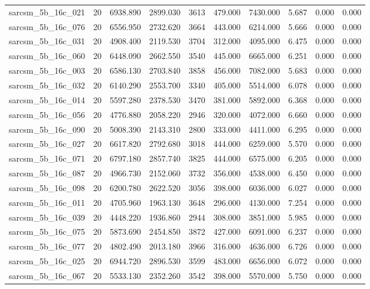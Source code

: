 \begin{tabular}{lrrrrrrrrr}
sarcsm\_5b\_16c\_021 & 20 & 6938.890 & 2899.030 & 3613 & 479.000 & 7430.000 & 5.687 & 0.000 & 0.000 \\
sarcsm\_5b\_16c\_076 & 20 & 6556.950 & 2732.620 & 3664 & 443.000 & 6214.000 & 5.666 & 0.000 & 0.000 \\
sarcsm\_5b\_16c\_031 & 20 & 4908.400 & 2119.530 & 3704 & 312.000 & 4095.000 & 6.475 & 0.000 & 0.000 \\
sarcsm\_5b\_16c\_060 & 20 & 6448.090 & 2662.550 & 3540 & 445.000 & 6665.000 & 6.251 & 0.000 & 0.000 \\
sarcsm\_5b\_16c\_003 & 20 & 6586.130 & 2703.840 & 3858 & 456.000 & 7082.000 & 5.683 & 0.000 & 0.000 \\
sarcsm\_5b\_16c\_032 & 20 & 6140.290 & 2553.700 & 3340 & 405.000 & 5514.000 & 6.078 & 0.000 & 0.000 \\
sarcsm\_5b\_16c\_014 & 20 & 5597.280 & 2378.530 & 3470 & 381.000 & 5892.000 & 6.368 & 0.000 & 0.000 \\
sarcsm\_5b\_16c\_056 & 20 & 4776.880 & 2058.220 & 2946 & 320.000 & 4072.000 & 6.660 & 0.000 & 0.000 \\
sarcsm\_5b\_16c\_090 & 20 & 5008.390 & 2143.310 & 2800 & 333.000 & 4411.000 & 6.295 & 0.000 & 0.000 \\
sarcsm\_5b\_16c\_027 & 20 & 6617.820 & 2792.680 & 3018 & 444.000 & 6259.000 & 5.570 & 0.000 & 0.000 \\
sarcsm\_5b\_16c\_071 & 20 & 6797.180 & 2857.740 & 3825 & 444.000 & 6575.000 & 6.205 & 0.000 & 0.000 \\
sarcsm\_5b\_16c\_087 & 20 & 4966.730 & 2152.060 & 3732 & 356.000 & 4538.000 & 6.450 & 0.000 & 0.000 \\
sarcsm\_5b\_16c\_098 & 20 & 6200.780 & 2622.520 & 3056 & 398.000 & 6036.000 & 6.027 & 0.000 & 0.000 \\
sarcsm\_5b\_16c\_011 & 20 & 4705.960 & 1963.130 & 3648 & 296.000 & 4130.000 & 7.254 & 0.000 & 0.000 \\
sarcsm\_5b\_16c\_039 & 20 & 4448.220 & 1936.860 & 2944 & 308.000 & 3851.000 & 5.985 & 0.000 & 0.000 \\
sarcsm\_5b\_16c\_075 & 20 & 5873.690 & 2454.850 & 3872 & 427.000 & 6091.000 & 6.237 & 0.000 & 0.000 \\
sarcsm\_5b\_16c\_077 & 20 & 4802.490 & 2013.180 & 3966 & 316.000 & 4636.000 & 6.726 & 0.000 & 0.000 \\
sarcsm\_5b\_16c\_025 & 20 & 6944.720 & 2896.530 & 3599 & 483.000 & 6656.000 & 6.072 & 0.000 & 0.000 \\
sarcsm\_5b\_16c\_067 & 20 & 5533.130 & 2352.260 & 3542 & 398.000 & 5570.000 & 5.750 & 0.000 & 0.000 \\

\end{tabular}
